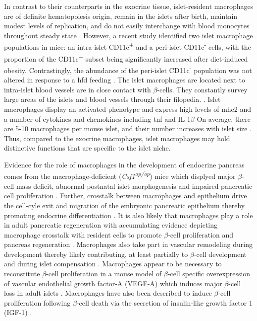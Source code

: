 \par In contrast to their counterparts in the exocrine tissue, islet-resident macrophages are of definite hematopoiesis origin, remain in the islets after birth, maintain modest levels of replication, and do not easily interchange with blood monocytes throughout steady state \textbf{\cite{calderon_pancreas_2015,cruz_macrophages_2020,carrero_resident_2017}}. However, a recent study identified two islet macrophage populations in mice: an intra-islet CD11c\textsuperscript{+} and a peri-islet CD11c\textsuperscript{-} cells, with the proportion of the CD11c\textsuperscript{+} subset being significantly increased after diet-induced obesity. Contrastingly, the abundance of the peri-islet CD11c\textsuperscript{-} population was not altered in response to a \gls{hfd} feeding \textbf{\cite{ying_expansion_2019}}. The islet macrophages are located next to intra-islet blood vessels are in close contact with $\beta$-cells. They constantly survey large areas of the islets and blood vessels through their filopedia. \textbf{\cite{carrero_resident_2017,calderon_dendritic_2008,zinselmeyer_resident_2018}}. Islet macrophages display an activated phenotype and express high levels of \gls{mhc2} and a number of cytokines and chemokines including \gls{tnf} and IL-1$\beta$ \textbf{\cite{calderon_pancreas_2015,carrero_resident_2017,ferris_islet-resident_2017}} On average, there are 5-10 macrophages per mouse islet, and their number increases with islet size \textbf{\cite{unanue_macrophages_2016}}. Thus, compared to the exocrine macrophages, islet macrophages may hold distinctive functions that are specific to the islet niche.\\
\par Evidence for the role of macrophages in the development of endocrine pancreas comes from the macrophage-deficient (\textit{Csf1\textsuperscript{op/op}}) mice which displyed major $\beta$-cell mass deficit, abnormal postnatal islet morphogenesis and impaired pancreatic cell proliferation \textbf{\cite{l_insulin_2004}}. Further, crosstalk between macrophages and epithelium drive the cell-cyle exit and migration of the embryonic pancreatic epithelium thereby promoting endocrine differentiation \textbf{\cite{mussar_macrophageepithelium_2014}}. It is also likely that macrophages play a role in adult pancreatic regeneration with accumulating evidence depicting macrophage crosstalk with resident cells to promote $\beta$-cell proliferation and pancreas regeneration \textbf{\cite{cruz_macrophages_2020}}. Macrophages also take part in vascular remodeling during development thereby likely contributing, at least partially to $\beta$-cell development \textbf{\cite{van_gassen_concise_2015}} and during islet compensation \textbf{\cite{chittezhath_islet_2019}}. Macrophages appear to be necessary to reconstitute $\beta$-cell proliferation in a mouse model of $\beta$-cell specific overexpression of vascular endothelial growth factor-A (VEGF-A) which induces major $\beta$-cell loss in adult islets \textbf{\cite{brissova_islet_2014}}. Macrophages have also been described to induce $\beta$-cell proliferation following $\beta$-cell death via the secretion of insulin-like growth factor 1 (IGF-1) \textbf{\cite{nackiewicz_islet_2020}}.\\ 

